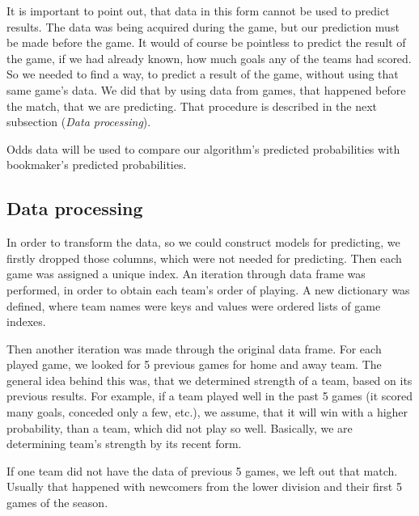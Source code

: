 \documentclass[conference]{IEEEtran}
\begin{document}
It is important to point out, that data in this form cannot be used to predict results. 
The data was being acquired during the game, but our prediction must be made before the game.
It would of course be pointless to predict the result of the game, if we had already known,
how much goals any of the teams had scored. So we needed to find a way, to predict a result 
of the game, without using that same game's data. We did that by using data from games, that 
happened before the match, that we are predicting. That procedure is described in the next
subsection (\textit{Data processing}).

Odds data will be used to compare our algorithm's predicted probabilities with bookmaker's
predicted probabilities.

\subsection{Data processing}

In order to transform the data, so we could construct models for predicting, we firstly 
dropped those columns, which were not needed for predicting. Then each game was assigned a 
unique index. An iteration through data frame was performed, in order to obtain each team's
order of playing. A new dictionary was defined, where team names were keys and values were
ordered lists of game indexes. 

Then another iteration was made through the original data frame. For each played game, we
looked for 5 previous games for home and away team. The general idea behind this was, 
that we determined strength of a team, based on its previous results. For example,
if a team played well in the past 5 games (it scored many goals, conceded only a few, etc.),
we assume, that it will win with a higher probability, than a team, which did not 
play so well. Basically, we are determining team's strength by its recent form. 

If one team did not have the data of previous 5 games, we left out that match. Usually
that happened with newcomers from the lower division and their first 5 games of the season.
\end{document}
